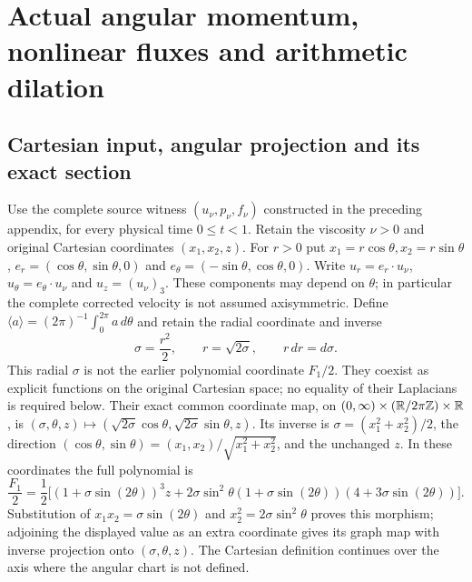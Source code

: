 \section*{Actual angular momentum, nonlinear fluxes and arithmetic dilation}

\subsection*{Cartesian input, angular projection and its exact section}

Use the complete source witness $(u_\nu,p_\nu,f_\nu)$ constructed in
the preceding appendix, for every physical time $0\leq t<1$. Retain
the viscosity $\nu>0$ and original Cartesian coordinates $(x_1,x_2,z)$.
For $r>0$ put $x_1=r\cos\theta,x_2=r\sin\theta$,
$e_r=(\cos\theta,\sin\theta,0)$ and
$e_\theta=(-\sin\theta,\cos\theta,0)$. Write
$u_r=e_r\cdot u_\nu$, $u_\theta=e_\theta\cdot u_\nu$ and
$u_z=(u_\nu)_3$. These components may depend on $\theta$; in particular
the complete corrected velocity is not assumed axisymmetric.
Define $\langle a\rangle=(2\pi)^{-1}\int_0^{2\pi}a\,d\theta$ and
retain the radial coordinate and inverse
\[
 \sigma=\frac{r^2}{2},\qquad r=\sqrt{2\sigma},\qquad
 r\,dr=d\sigma.
\]
This radial $\sigma$ is not the earlier polynomial coordinate $F_1/2$.
They coexist as explicit functions on the original Cartesian space;
no equality of their Laplacians is required below.
Their exact common coordinate map, on
$(0,\infty)\times(\mathbb R/2\pi\mathbb Z)\times\mathbb R$, is
$(\sigma,\theta,z)\mapsto
(\sqrt{2\sigma}\cos\theta,\sqrt{2\sigma}\sin\theta,z)$.
Its inverse is $\sigma=(x_1^2+x_2^2)/2$, the direction
$(\cos\theta,\sin\theta)=(x_1,x_2)/\sqrt{x_1^2+x_2^2}$,
and the unchanged $z$. In these coordinates the full polynomial is
\[
 \frac{F_1}{2}=\frac12\bigl[
 (1+\sigma\sin(2\theta))^3z
 +2\sigma\sin^2\theta(1+\sigma\sin(2\theta))
                         (4+3\sigma\sin(2\theta))\bigr].
\]
Substitution of $x_1x_2=\sigma\sin(2\theta)$ and
$x_2^2=2\sigma\sin^2\theta$ proves this morphism; adjoining the
displayed value as an extra coordinate gives its graph map with
inverse projection onto $(\sigma,\theta,z)$. The Cartesian definition
continues over the axis where the angular chart is not defined.

